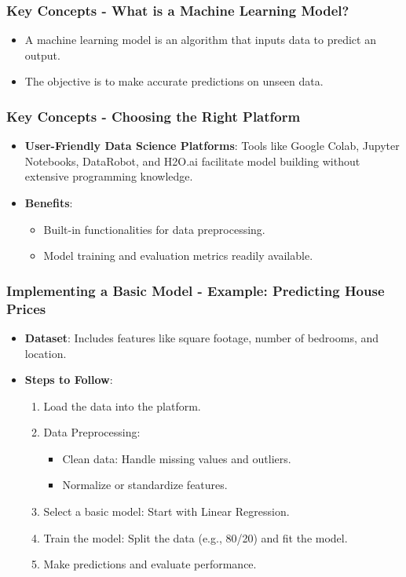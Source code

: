\documentclass[aspectratio=169]{beamer}
\begin{document}
\begin{frame}
    \frametitle{Key Concepts - What is a Machine Learning Model?}
    \begin{itemize}
        \item A machine learning model is an algorithm that inputs data to predict an output.
        \item The objective is to make accurate predictions on unseen data.
    \end{itemize}
\end{frame}

\begin{frame}
    \frametitle{Key Concepts - Choosing the Right Platform}
    \begin{itemize}
        \item \textbf{User-Friendly Data Science Platforms}: 
            Tools like Google Colab, Jupyter Notebooks, DataRobot, and H2O.ai facilitate model building without extensive programming knowledge.
        \item \textbf{Benefits}:
            \begin{itemize}
                \item Built-in functionalities for data preprocessing.
                \item Model training and evaluation metrics readily available.
            \end{itemize}
    \end{itemize}
\end{frame}

\begin{frame}
    \frametitle{Implementing a Basic Model - Example: Predicting House Prices}
    \begin{itemize}
        \item \textbf{Dataset}: Includes features like square footage, number of bedrooms, and location.
        \item \textbf{Steps to Follow}:
            \begin{enumerate}
                \item Load the data into the platform.
                \item Data Preprocessing:
                    \begin{itemize}
                        \item Clean data: Handle missing values and outliers.
                        \item Normalize or standardize features.
                    \end{itemize}
                \item Select a basic model: Start with Linear Regression.
                \item Train the model: Split the data (e.g., 80/20) and fit the model.
                \item Make predictions and evaluate performance.
            \end{enumerate}
    \end{itemize}
\end{frame}
\end{document}
